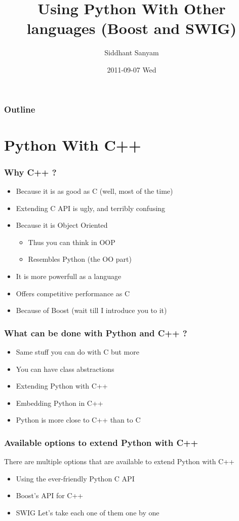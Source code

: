 \documentclass{beamer}
\title{Using Python With Other languages (Boost and SWIG)}
\author{Siddhant Sanyam}
\date{2011-09-07 Wed}
\begin{document}
\maketitle

\begin{frame}
\frametitle{Outline}
\setcounter{tocdepth}{3}
\tableofcontents
\end{frame}



\section{Python With C++}
\label{sec-1}
\begin{frame}
\frametitle{Why C++ ?}
\label{sec-1_1}


\begin{itemize}
\item Because it is as good as C (well, most of the time)
\item Extending C API is ugly, and terribly confusing
\item Because it is Object Oriented
\begin{itemize}
\item Thus you can think in OOP
\item Resembles Python (the OO part)
\end{itemize}
\item It is more powerfull as a language
\item Offers competitive performance as C
\item Because of Boost (wait till I introduce you to it)
\end{itemize}
\end{frame}
\begin{frame}
\frametitle{What can be done with Python and C++ ?}
\label{sec-1_2}


\begin{itemize}
\item Same stuff you can do with C but more
\item You can have class abstractions
\item Extending Python with C++
\item Embedding Python in C++
\item Python is more close to C++ than to C
\end{itemize}
\end{frame}
\begin{frame}
\frametitle{Available options to extend Python with C++}
\label{sec-1_3}

   There are multiple options that are available to extend Python with C++

\begin{itemize}
\item Using the ever-friendly Python C API
\item Boost's API for C++
\item SWIG
     Let's take each one of them one by one
\end{itemize}
\end{frame}
\end{document}
